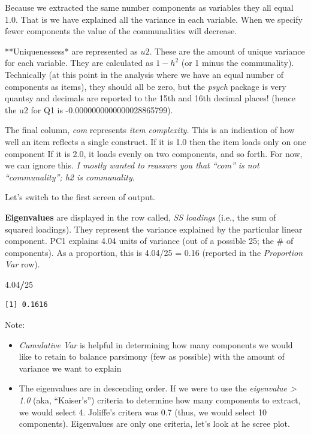 \documentclass[
  english,
]{book}
\newenvironment{Shaded}{\begin{snugshade}}{\end{snugshade}}
\newcommand{\DecValTok}[1]{\textcolor[rgb]{0.00,0.00,0.81}{#1}}
\newcommand{\FloatTok}[1]{\textcolor[rgb]{0.00,0.00,0.81}{#1}}
\newcommand{\OperatorTok}[1]{\textcolor[rgb]{0.81,0.36,0.00}{\textbf{#1}}}
\providecommand{\tightlist}{%
  \setlength{\itemsep}{0pt}\setlength{\parskip}{0pt}}
\begin{document}
Because we extracted the same number components as variables they all equal 1.0. That is we have explained all the variance in each variable. When we specify fewer components the value of the communalities will decrease.

**Uniquenessess* are represented as \(u2\). These are the amount of unique variance for each variable. They are calculated as \(1 - h^2\) (or 1 minus the communality). Technically (at this point in the analysis where we have an equal number of components as items), they should all be zero, but the \emph{psych} package is very quantsy and decimals are reported to the 15th and 16th decimal places! (hence the u2 for Q1 is -0.0000000000000028865799).

The final column, \emph{com} represents \emph{item complexity.} This is an indication of how well an item reflects a single construct. If it is 1.0 then the item loads only on one component If it is 2.0, it loads evenly on two components, and so forth. For now, we can ignore this. \emph{I mostly wanted to reassure you that ``com'' is not ``communality''; h2 is communality}.

Let's switch to the first screen of output.

\textbf{Eigenvalues} are displayed in the row called, \emph{SS loadings} (i.e., the sum of squared loadings). They represent the variance explained by the particular linear component. PC1 explains 4.04 units of variance (out of a possible 25; the \# of components). As a proportion, this is 4.04/25 = 0.16 (reported in the \emph{Proportion Var} row).

\begin{Shaded}
\begin{Highlighting}[]
\FloatTok{4.04}\OperatorTok{/}\DecValTok{25}
\end{Highlighting}
\end{Shaded}

\begin{verbatim}
[1] 0.1616
\end{verbatim}

Note:

\begin{itemize}
\tightlist
\item
  \emph{Cumulative Var} is helpful in determining how many components we would like to retain to balance parsimony (few as possible) with the amount of variance we want to explain
\item
  The eigenvalues are in descending order. If we were to use the \emph{eigenvalue \textgreater{} 1.0} (aka, ``Kaiser's'') criteria to determine how many components to extract, we would select 4. Joliffe's critera was 0.7 (thus, we would select 10 components). Eigenvalues are only one criteria, let's look at he scree plot.
\end{itemize}
\end{document}
